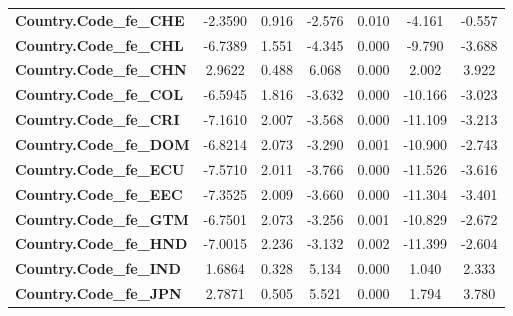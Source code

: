 \begin{center}
\begin{tabular}{lcccccc}
\textbf{Country.Code\_fe\_CHE}                                     &      -2.3590  &        0.916     &    -2.576  &         0.010        &       -4.161    &       -0.557     \\
\textbf{Country.Code\_fe\_CHL}                                     &      -6.7389  &        1.551     &    -4.345  &         0.000        &       -9.790    &       -3.688     \\
\textbf{Country.Code\_fe\_CHN}                                     &       2.9622  &        0.488     &     6.068  &         0.000        &        2.002    &        3.922     \\
\textbf{Country.Code\_fe\_COL}                                     &      -6.5945  &        1.816     &    -3.632  &         0.000        &      -10.166    &       -3.023     \\
\textbf{Country.Code\_fe\_CRI}                                     &      -7.1610  &        2.007     &    -3.568  &         0.000        &      -11.109    &       -3.213     \\
\textbf{Country.Code\_fe\_DOM}                                     &      -6.8214  &        2.073     &    -3.290  &         0.001        &      -10.900    &       -2.743     \\
\textbf{Country.Code\_fe\_ECU}                                     &      -7.5710  &        2.011     &    -3.766  &         0.000        &      -11.526    &       -3.616     \\
\textbf{Country.Code\_fe\_EEC}                                     &      -7.3525  &        2.009     &    -3.660  &         0.000        &      -11.304    &       -3.401     \\
\textbf{Country.Code\_fe\_GTM}                                     &      -6.7501  &        2.073     &    -3.256  &         0.001        &      -10.829    &       -2.672     \\
\textbf{Country.Code\_fe\_HND}                                     &      -7.0015  &        2.236     &    -3.132  &         0.002        &      -11.399    &       -2.604     \\
\textbf{Country.Code\_fe\_IND}                                     &       1.6864  &        0.328     &     5.134  &         0.000        &        1.040    &        2.333     \\
\textbf{Country.Code\_fe\_JPN}                                     &       2.7871  &        0.505     &     5.521  &         0.000        &        1.794    &        3.780     \\

\end{tabular}
\end{center}
